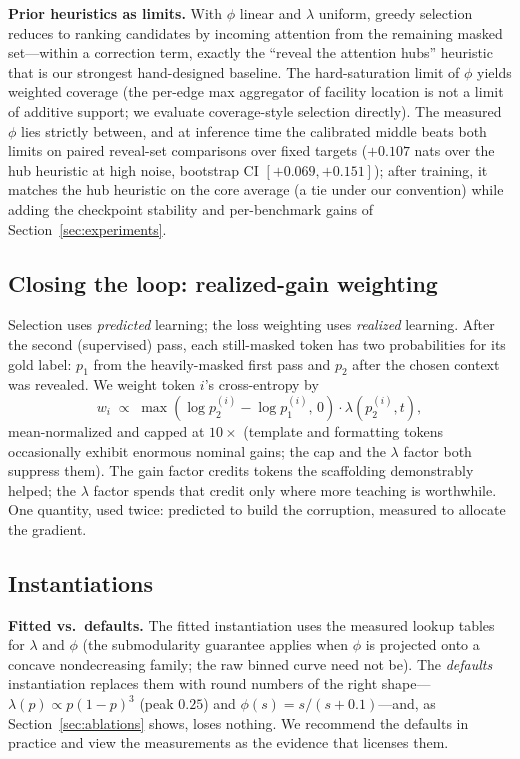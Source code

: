 \documentclass{article} %
\begin{document}
\textbf{Prior heuristics as limits.} With $\phi$ linear and $\lambda$ uniform, greedy selection reduces to ranking candidates by incoming attention from the remaining masked set---within a correction term, exactly the ``reveal the attention hubs'' heuristic that is our strongest hand-designed baseline. The hard-saturation limit of $\phi$ yields weighted coverage (the per-edge max aggregator of facility location is not a limit of additive support; we evaluate coverage-style selection directly). The measured $\phi$ lies strictly between, and at inference time the calibrated middle beats both limits on paired reveal-set comparisons over fixed targets ($+0.107$ nats over the hub heuristic at high noise, bootstrap CI $[+0.069, +0.151]$); after training, it matches the hub heuristic on the core average (a tie under our convention) while adding the checkpoint stability and per-benchmark gains of Section~\ref{sec:experiments}.

\subsection{Closing the loop: realized-gain weighting}
\label{sec:weighting}

Selection uses \emph{predicted} learning; the loss weighting uses \emph{realized} learning. After the second (supervised) pass, each still-masked token has two probabilities for its gold label: $p_1$ from the heavily-masked first pass and $p_2$ after the chosen context was revealed. We weight token $i$'s cross-entropy by
\begin{equation}
w_i \;\propto\; \max(\log p_2^{(i)} - \log p_1^{(i)},\, 0) \cdot \lambda(p_2^{(i)}, t),
\end{equation}
mean-normalized and capped at $10\times$ (template and formatting tokens occasionally exhibit enormous nominal gains; the cap and the $\lambda$ factor both suppress them). The gain factor credits tokens the scaffolding demonstrably helped; the $\lambda$ factor spends that credit only where more teaching is worthwhile. One quantity, used twice: predicted to build the corruption, measured to allocate the gradient.

\subsection{Instantiations}
\label{sec:instantiations}

\textbf{Fitted vs.\ defaults.} The fitted instantiation uses the measured lookup tables for $\lambda$ and $\phi$ (the submodularity guarantee applies when $\phi$ is projected onto a concave nondecreasing family; the raw binned curve need not be). The \emph{defaults} instantiation replaces them with round numbers of the right shape---$\lambda(p) \propto p(1-p)^3$ (peak $0.25$) and $\phi(s) = s/(s+0.1)$---and, as Section~\ref{sec:ablations} shows, loses nothing. We recommend the defaults in practice and view the measurements as the evidence that licenses them.
\end{document}
